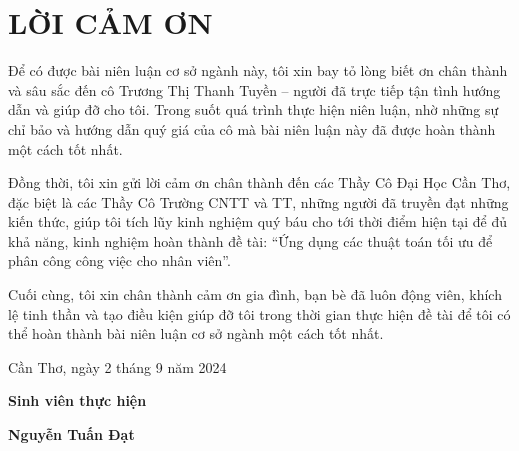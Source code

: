 \section*{LỜI CẢM ƠN}
Để có được bài niên luận cơ sở ngành này, tôi xin bay tỏ lòng biết ơn chân thành và
sâu sắc đến cô Trương Thị Thanh Tuyền – người đã trực tiếp tận tình hướng dẫn và giúp
đỡ cho tôi. Trong suốt quá trình thực hiện niên luận, nhờ những sự chỉ bảo và hướng dẫn
quý giá của cô mà bài niên luận này đã được hoàn thành một cách tốt nhất.
\par
Đồng thời, tôi xin gửi lời cảm ơn chân thành đến các Thầy Cô Đại Học Cần Thơ,
đặc biệt là các Thầy Cô Trường CNTT và TT, những người đã truyền đạt những kiến thức,
giúp tôi tích lũy kinh nghiệm quý báu cho tới thời điểm hiện tại để đủ khả năng, kinh
nghiệm hoàn thành đề tài: “Ứng dụng các thuật toán tối ưu để phân công công việc cho nhân viên”.
\par
Cuối cùng, tôi xin chân thành cảm ơn gia đình, bạn bè đã luôn động viên, khích lệ
tinh thần và tạo điều kiện giúp đỡ tôi trong thời gian thực hiện đề tài để tôi có thể hoàn
thành bài niên luận cơ sở ngành một cách tốt nhất.

\vspace{6pt}
\hspace{7cm}Cần Thơ, ngày 2 tháng 9 năm 2024

\hspace{9cm}\textbf{Sinh viên thực hiện}

\vspace{2cm}
\hspace{9.25cm}\textbf{Nguyễn Tuấn Đạt}
\thispagestyle{empty}
\newpage
